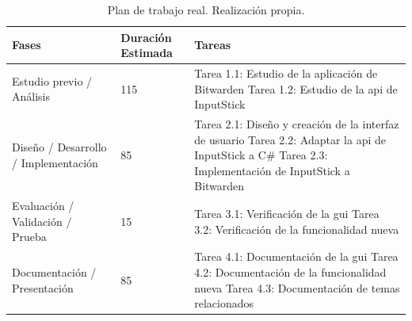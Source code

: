 \begin{table}[H]
\begin{tabular}{|p{}|p{}|p{}|}
\hline
Fases                                & Duración \newline Estimada & Tareas \\ \hline

Estudio previo / Análisis            & 115               & Tarea 1.1: Estudio de la aplicación de Bitwarden \newline Tarea 1.2: Estudio de la \gls{api} de InputStick \\ \hline

Diseño / Desarrollo / Implementación & 85               & Tarea 2.1: Diseño y creación de la interfaz de usuario \newline Tarea 2.2: Adaptar la \gls{api} de InputStick a C\# \newline Tarea 2.3: Implementación de InputStick a Bitwarden \\ \hline

Evaluación / Validación / Prueba     & 15                & Tarea 3.1: Verificación de la \gls{gui} \newline Tarea 3.2: Verificación de la funcionalidad nueva \\ \hline

Documentación / Presentación         & 85               & Tarea 4.1: Documentación de la \gls{gui} \newline Tarea 4.2: Documentación de la funcionalidad nueva \newline Tarea 4.3: Documentación de temas relacionados \\ \hline
\end{tabular}
\caption{Plan de trabajo real. Realización propia.}
\label{tab:plan_real}
\end{table}